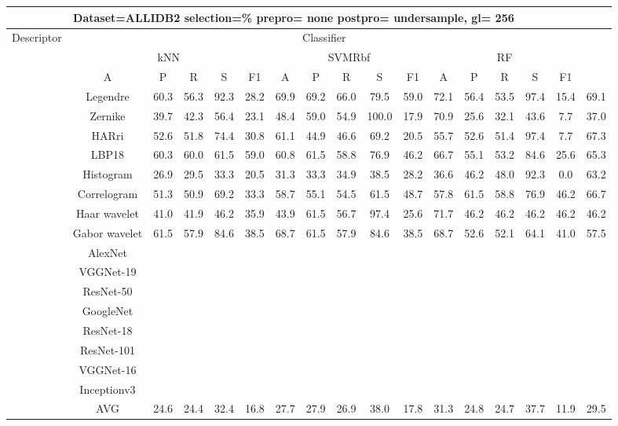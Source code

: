\documentclass[12pt,italian]{article}
\begin{document}
\begin{tiny}
\begin{longtable}{lcccccccccccccccc}
\toprule
\multicolumn{16}{c}{Dataset=ALLIDB2 selection=\% prepro= none postpro= undersample, gl= 256} \\ 
\toprule
Descriptor & \multicolumn{15}{c}{Classifier} \\ 
& \multicolumn{5}{c}{kNN} & \multicolumn{5}{c}{SVMRbf} & \multicolumn{5}{c}{RF} \\ 
& A & P & R & S & F1 & A & P & R & S & F1 & A & P & R & S & F1 \\ 
\midrule
& Legendre & 60.3 & 56.3 & 92.3 & 28.2 & 69.9 & 69.2 & 66.0 & 79.5 & 59.0 & 72.1 & 56.4 & 53.5 & 97.4 & 15.4 & 69.1 \\ 
& Zernike & 39.7 & 42.3 & 56.4 & 23.1 & 48.4 & 59.0 & 54.9 & 100.0 & 17.9 & 70.9 & 25.6 & 32.1 & 43.6 &  7.7 & 37.0 \\ 
& HARri & 52.6 & 51.8 & 74.4 & 30.8 & 61.1 & 44.9 & 46.6 & 69.2 & 20.5 & 55.7 & 52.6 & 51.4 & 97.4 &  7.7 & 67.3 \\ 
& LBP18 & 60.3 & 60.0 & 61.5 & 59.0 & 60.8 & 61.5 & 58.8 & 76.9 & 46.2 & 66.7 & 55.1 & 53.2 & 84.6 & 25.6 & 65.3 \\ 
& Histogram & 26.9 & 29.5 & 33.3 & 20.5 & 31.3 & 33.3 & 34.9 & 38.5 & 28.2 & 36.6 & 46.2 & 48.0 & 92.3 &  0.0 & 63.2 \\ 
& Correlogram & 51.3 & 50.9 & 69.2 & 33.3 & 58.7 & 55.1 & 54.5 & 61.5 & 48.7 & 57.8 & 61.5 & 58.8 & 76.9 & 46.2 & 66.7 \\ 
& Haar wavelet & 41.0 & 41.9 & 46.2 & 35.9 & 43.9 & 61.5 & 56.7 & 97.4 & 25.6 & 71.7 & 46.2 & 46.2 & 46.2 & 46.2 & 46.2 \\ 
& Gabor wavelet & 61.5 & 57.9 & 84.6 & 38.5 & 68.7 & 61.5 & 57.9 & 84.6 & 38.5 & 68.7 & 52.6 & 52.1 & 64.1 & 41.0 & 57.5 \\ 
& AlexNet \\ 
& VGGNet-19 \\ 
& ResNet-50 \\ 
& GoogleNet \\ 
& ResNet-18 \\ 
& ResNet-101 \\ 
& VGGNet-16 \\ 
& Inceptionv3 \\ 
\hline
& AVG & 24.6 & 24.4 & 32.4 & 16.8 & 27.7 & 27.9 & 26.9 & 38.0 & 17.8 & 31.3 & 24.8 & 24.7 & 37.7 & 11.9 & 29.5 \\ 
\hline
\bottomrule
\end{longtable} 


\end{tiny}
\end{document}
